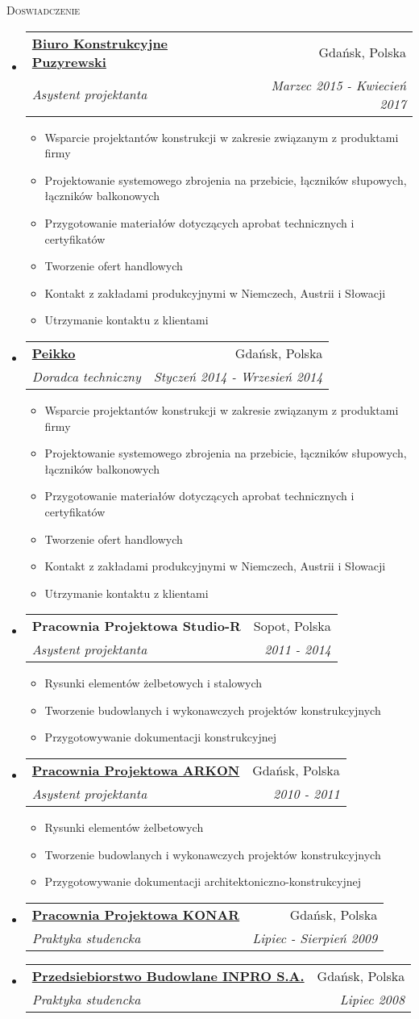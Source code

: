 \documentclass[letterpaper,11pt]{article}
\makeatletter
\newcommand{\resheading}[1]{
  \begin{tcolorbox}
  \textsc{#1}
  \end{tcolorbox}
}
\newcommand{\resitem}[1]{\item #1 \vspace{-2pt}}
\newcommand{\ressubheading}[4]{
\begin{tabular*}{6.5in}{l@{\extracolsep{\fill}}r}
		\textbf{#1} & #2 \\
		\textit{#3} & \textit{#4} \\
\end{tabular*}\vspace{-6pt}}
\makeatother
\begin{document}
\resheading{Doswiadczenie}
\begin{itemize}

\item
  \ressubheading{\href{www.puzyrewski.pl}{Biuro Konstrukcyjne Puzyrewski}}{Gdańsk, Polska}{Asystent projektanta}{Marzec 2015 - Kwiecień 2017}
  \begin{itemize}
    \resitem{Wsparcie projektantów konstrukcji w zakresie związanym z produktami firmy}
    \resitem{Projektowanie systemowego zbrojenia na przebicie, łączników słupowych, łączników balkonowych}
    \resitem{Przygotowanie materiałów dotyczących aprobat technicznych i certyfikatów}
    \resitem{Tworzenie ofert handlowych}
    \resitem{Kontakt z zakładami produkcyjnymi w Niemczech, Austrii i Słowacji}
    \resitem{Utrzymanie kontaktu z klientami}
  \end{itemize}

\item
  \ressubheading{\href{www.peikko.pl}{Peikko}}{Gdańsk, Polska}{Doradca techniczny}{Styczeń 2014 - Wrzesień 2014}
  \begin{itemize}
    \resitem{Wsparcie projektantów konstrukcji w zakresie związanym z produktami firmy}
    \resitem{Projektowanie systemowego zbrojenia na przebicie, łączników słupowych, łączników balkonowych}
    \resitem{Przygotowanie materiałów dotyczących aprobat technicznych i certyfikatów}
    \resitem{Tworzenie ofert handlowych}
    \resitem{Kontakt z zakładami produkcyjnymi w Niemczech, Austrii i Słowacji}
    \resitem{Utrzymanie kontaktu z klientami}
  \end{itemize}

\item 
  \ressubheading{Pracownia Projektowa Studio-R}{Sopot, Polska}{Asystent projektanta}{2011 - 2014}
  \begin{itemize}
    \resitem{Rysunki elementów żelbetowych i stalowych}
    \resitem{Tworzenie budowlanych i wykonawczych projektów konstrukcyjnych}
    \resitem{Przygotowywanie dokumentacji konstrukcyjnej}
  \end{itemize}
  
\item
  \ressubheading{\href{http://www.konar.eu/}{Pracownia Projektowa ARKON}}{Gdańsk, Polska}{Asystent projektanta}{2010 - 2011}
  \begin{itemize}
    \resitem{Rysunki elementów żelbetowych}
    \resitem{Tworzenie budowlanych i wykonawczych projektów konstrukcyjnych}
    \resitem{Przygotowywanie dokumentacji architektoniczno-konstrukcyjnej}
  \end{itemize}
  
\item
  \ressubheading{\href{http://www.konar.eu/}{Pracownia Projektowa KONAR}}{Gdańsk, Polska}{Praktyka studencka}{Lipiec - Sierpień 2009}

\item
  \ressubheading{\href{https://www.inpro.com.pl}{Przedsiebiorstwo Budowlane INPRO S.A.}}{Gdańsk, Polska}{Praktyka studencka}{Lipiec 2008}

\end{itemize}
\end{document}
